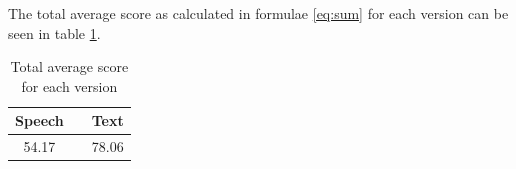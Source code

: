 The total average score as calculated in formulae \ref{eq:sum} for each version can be seen in table \ref{tot_score}.
\begin{table}[h!]
  \centering
  \begin{tabular}{ccc}
    \toprule
    Speech &   & Text\\
    \midrule
    54.17 &   & 78.06\\
    \bottomrule
  \end{tabular}
  \caption{Total average score for each version}\label{tot_score}
\end{table}